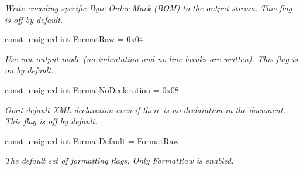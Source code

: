 \begin{DoxyCompactItemize}
\begin{DoxyCompactList}\small\item\em Write encoding-\/specific Byte Order Mark (BOM) to the output stream. This flag is off by default. \item\end{DoxyCompactList}\item 
\hypertarget{namespacephys_1_1xml_a6f6696cbdc48011817adad7978e83976}{
const unsigned int \hyperlink{namespacephys_1_1xml_a6f6696cbdc48011817adad7978e83976}{FormatRaw} = 0x04}
\label{d9/d27/namespacephys_1_1xml_a6f6696cbdc48011817adad7978e83976}

\begin{DoxyCompactList}\small\item\em Use raw output mode (no indentation and no line breaks are written). This flag is on by default. \item\end{DoxyCompactList}\item 
\hypertarget{namespacephys_1_1xml_aee4ccb3535945d4808a0cf6abe4cb050}{
const unsigned int \hyperlink{namespacephys_1_1xml_aee4ccb3535945d4808a0cf6abe4cb050}{FormatNoDeclaration} = 0x08}
\label{d9/d27/namespacephys_1_1xml_aee4ccb3535945d4808a0cf6abe4cb050}

\begin{DoxyCompactList}\small\item\em Omit default XML declaration even if there is no declaration in the document. This flag is off by default. \item\end{DoxyCompactList}\item 
\hypertarget{namespacephys_1_1xml_a08bf6aab51f79929d9097706a5e64408}{
const unsigned int \hyperlink{namespacephys_1_1xml_a08bf6aab51f79929d9097706a5e64408}{FormatDefault} = \hyperlink{namespacephys_1_1xml_a6f6696cbdc48011817adad7978e83976}{FormatRaw}}
\label{d9/d27/namespacephys_1_1xml_a08bf6aab51f79929d9097706a5e64408}

\begin{DoxyCompactList}\small\item\em The default set of formatting flags. Only FormatRaw is enabled. \item\end{DoxyCompactList}\end{DoxyCompactItemize}


